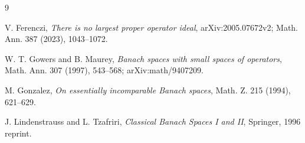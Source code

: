 \documentclass[11pt]{article}
\begin{document}
\begin{thebibliography}{9}

V. Ferenczi,
\emph{There is no largest proper operator ideal},
arXiv:2005.07672v2; Math. Ann. 387 (2023), 1043--1072.

W. T. Gowers and B. Maurey,
\emph{Banach spaces with small spaces of operators},
Math. Ann. 307 (1997), 543--568; arXiv:math/9407209.

M. Gonzalez,
\emph{On essentially incomparable Banach spaces},
Math. Z. 215 (1994), 621--629.

J. Lindenstrauss and L. Tzafriri,
\emph{Classical Banach Spaces I and II},
Springer, 1996 reprint.

\end{thebibliography}
\end{document}
